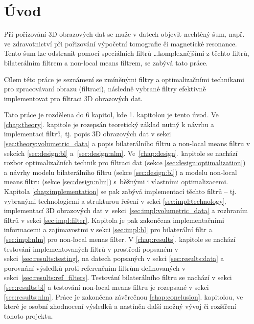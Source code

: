 
\chapter{Úvod}
\label{chap:introduction}

Při pořizování 3D obrazových dat se muže v datech objevit nechtěný šum, např.  ve zdravotnictví při pořizování výpočetní tomografie či magnetické resonance. Tento šum lze odstranit pomocí speciálních filtrů \dots komplexnějšími z těchto filtrů, bilaterálním filtrem a non-local means filtrem, se zabývá tato práce. 

Cílem této práce je seznámení se zmíněnými filtry a optimalizačními technikami pro zpracovávaní obrazu (filtraci), následně vybrané filtry efektivně implementovat pro filtraci 3D obrazových dat.

Tato práce je rozdělena do 6 kapitol, kde \ref{chap:introduction}. kapitolou je tento úvod. Ve \ref{chap:theory}. kapitole je rozepsán teoretický základ nutný k návrhu a implementaci filtrů, tj. popis 3D obrazových dat v sekci \ref{sec:theory:volumetric_data} a popis bilaterálního filtru a non-local means filtru v sekcích \ref{sec:design:bl} a~\ref{sec:design:nlm}. Ve~\ref{chap:design}. kapitole se nachází rozbor optimalizačních technik pro filtraci dat (sekce \ref{sec:design:optimalization}) a návrhy modelu bilaterálního filtru (sekce \ref{sec:design:bl}) a modelu non-local means filtru (sekce \ref{sec:design:nlm}) s~běžnými i vlastními optimalizacemi. 
Kapitola \ref{chap:implementation} se pak zabývá implementací těchto filtrů -- tj. vybranými technologiemi a strukturou řešení v sekci \ref{sec:impl:technology}, implementací 3D obrazových dat v~sekci~\ref{sec:impl:volumetric_data} a rozhraním filtrů v sekci \ref{sec:impl:filter}. Kapitola je pak zakončena implementačními informacemi a zajímavostmi v sekci \ref{sec:impl:bl} pro bilaterální filtr a \ref{sec:impl:nlm} pro non-local menas filter. V \ref{chap:results}. kapitole se nachází testování implementovaných filtrů v prostředí popsaném v sekci~\ref{sec:results:testing}, na datech popsaných v sekci \ref{sec:results:data} a porovnání výsledků proti referenčním filtrům definovaných v sekci~\ref{sec:results:ref_filters}. Testování bilaterálního filtru se nachází v  sekci \ref{sec:results:bl} a testování non-local means filtru je rozepsané v sekci \ref{sec:results:nlm}. Práce je zakončena závěrečnou \ref{chap:conclusion}. kapitolou, ve které je osobní zhodnocení výsledků a nastíněn další možný vývoj či rozšíření tohoto projektu.

